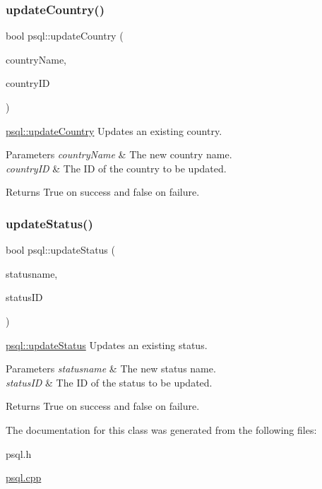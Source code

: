 \subsubsection{\texorpdfstring{update\+Country()}{updateCountry()}}
{\footnotesize\ttfamily bool psql\+::update\+Country (\begin{DoxyParamCaption}\item[{Q\+String}]{country\+Name,  }\item[{int}]{country\+ID }\end{DoxyParamCaption})}



\hyperlink{classpsql_ae662278c5fb8ff3471ee1442e69482e2}{psql\+::update\+Country} Updates an existing country. 


\begin{DoxyParams}{Parameters}
{\em country\+Name} & The new country name. \\
\hline
{\em country\+ID} & The ID of the country to be updated. \\
\hline
\end{DoxyParams}
\begin{DoxyReturn}{Returns}
True on success and false on failure. 
\end{DoxyReturn}
\mbox{\label{classpsql_a620364c99c98e20720908deb045536a0}} 
\subsubsection{\texorpdfstring{update\+Status()}{updateStatus()}}
{\footnotesize\ttfamily bool psql\+::update\+Status (\begin{DoxyParamCaption}\item[{Q\+String}]{statusname,  }\item[{int}]{status\+ID }\end{DoxyParamCaption})}



\hyperlink{classpsql_a620364c99c98e20720908deb045536a0}{psql\+::update\+Status} Updates an existing status. 


\begin{DoxyParams}{Parameters}
{\em statusname} & The new status name. \\
\hline
{\em status\+ID} & The ID of the status to be updated. \\
\hline
\end{DoxyParams}
\begin{DoxyReturn}{Returns}
True on success and false on failure. 
\end{DoxyReturn}


The documentation for this class was generated from the following files\+:\begin{DoxyCompactItemize}
\item 
psql.\+h\item 
\hyperlink{psql_8cpp}{psql.\+cpp}\end{DoxyCompactItemize}
